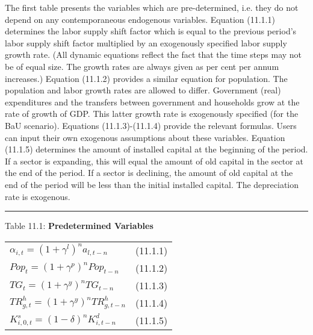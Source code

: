 \documentclass[12pt]{article}
\begin{document}
The first table presents the variables which are pre-determined, i.e. they do not depend on any contemporaneous endogenous variables. Equation (11.1.1) determines the labor supply shift factor which is equal to the previous period’s labor supply shift factor multiplied by an exogenously specified labor supply growth rate. (All dynamic equations reflect the fact that the time steps may not be of equal size. The growth rates are always given as per cent per annum increases.) Equation (11.1.2) provides a similar equation for population. The population and labor growth rates are allowed to differ. Government (real) expenditures and the transfers between government and households grow at the rate of growth of GDP. This latter growth rate is exogenously specified (for the BaU scenario). Equations (11.1.3)-(11.1.4) provide the relevant formulas. Users can input their own exogenous assumptions about these variables. Equation (11.1.5) determines the amount of installed capital at the beginning of the period. If a sector is expanding, this will equal the amount of old capital in the sector at the end of the period. If a sector is declining, the amount of old capital at the end of the period will be less than the initial installed capital. The depreciation rate is exogenous.

\newpage

\noindent\rule{\linewidth}{0.4pt}
\begin{center}
\begin{large}
{\centering Table 11.1: \textbf{Predetermined Variables} \par}


\begin{tabular}{>{\raggedright}p{} l}

$\alpha_{i, t} = \left(1 + \gamma^l\right)^n a_{l, t-n}$ & (11.1.1) \\[15pt]

$Pop_t = \left(1 + \gamma^p\right)^n Pop_{t-n}$ & (11.1.2) \\[15pt]

$TG_t = \left(1 + \gamma^y\right)^n TG_{t-n}$ & (11.1.3) \\[15pt]

$TR^h_{g, t} = \left(1 + \gamma^y\right)^n TR^h_{g, t-n}$ & (11.1.4) \\[15pt]

$K^s_{i, 0, t} = \left(1 - \delta\right)^n K^d_{i, t-n}$ & (11.1.5) \\[20pt]

\hline
\end{tabular}
\end{large}
\end{center}
\end{document}
